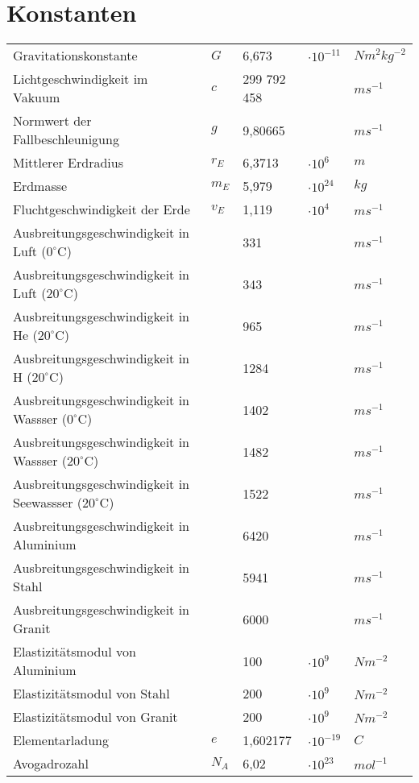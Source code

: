\section{Konstanten}
\begin{tabular}{l l l l l}
Gravitationskonstante 									& $G$ 	& 6,673 			& $ \cdot 10 ^ {-11} $ 	& $N m^2kg^{-2}$ \\
Lichtgeschwindigkeit im Vakuum 							& $c$ 	& 299 792 458 	& 						& $ ms^{-1} $ \\
Normwert der Fallbeschleunigung 							& $g$ 	& 9,80665		& 						& $ ms^{-1} $ \\\hline
Mittlerer Erdradius										& $r_E$ 	& 6,3713			& $ \cdot 10 ^ {6} $		& $ m $ \\
Erdmasse													& $m_E$ 	& 5,979			& $ \cdot 10 ^ {24} $	& $ kg $ \\
Fluchtgeschwindigkeit der Erde							& $v_E$	& 1,119			& $ \cdot 10 ^ {4} $ 	& $ ms^{-1} $ \\\hline\hline
Ausbreitungsgeschwindigkeit in Luft ($0 ^\circ$C)			&		& 331			&						& $ ms^{-1} $ \\
Ausbreitungsgeschwindigkeit in Luft ($20 ^\circ$C)		&		& 343			&						& $ ms^{-1} $ \\
Ausbreitungsgeschwindigkeit in He ($20 ^\circ$C)			&		& 965			&						& $ ms^{-1} $ \\
Ausbreitungsgeschwindigkeit in H ($20 ^\circ$C)			&		& 1284			&						& $ ms^{-1} $ \\\hline
Ausbreitungsgeschwindigkeit in Wassser ($0^\circ$C)		&		& 1402			&						& $ ms^{-1} $ \\
Ausbreitungsgeschwindigkeit in Wassser ($20^\circ$C)		&		& 1482			&						& $ ms^{-1} $ \\
Ausbreitungsgeschwindigkeit in Seewassser ($20^\circ$C)	&		& 1522			&						& $ ms^{-1} $ \\\hline
Ausbreitungsgeschwindigkeit in Aluminium 				&		& 6420			&						& $ ms^{-1} $ \\
Ausbreitungsgeschwindigkeit in Stahl		 				&		& 5941			&						& $ ms^{-1} $ \\
Ausbreitungsgeschwindigkeit in Granit	 				&		& 6000			&						& $ ms^{-1} $ \\\hline
Elastizitätsmodul von Aluminium							&		& 100			& $ \cdot 10 ^ {9} $		& $ Nm^{-2} $ \\
Elastizitätsmodul von Stahl								&		& 200			& $ \cdot 10 ^ {9} $		& $ Nm^{-2} $ \\
Elastizitätsmodul von Granit								&		& 200			& $ \cdot 10 ^ {9} $		& $ Nm^{-2} $ \\\hline\hline
Elementarladung											& $e$	& 1,602177		& $ \cdot 10 ^ {-19}$	& $ C $		\\
Avogadrozahl												& $N_A$ 	& 6,02			& $ \cdot 10 ^ {23}$		& $ mol^{-1}$ \\
\end{tabular}